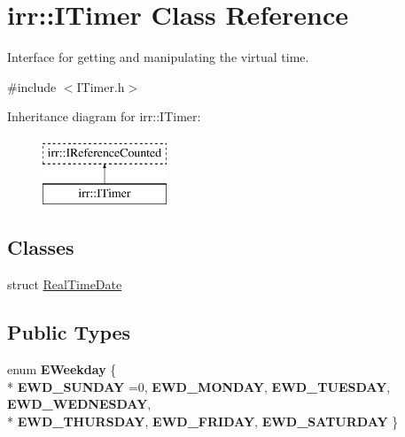 \hypertarget{classirr_1_1ITimer}{}\section{irr\+:\+:I\+Timer Class Reference}
\label{classirr_1_1ITimer}


Interface for getting and manipulating the virtual time.  




{\ttfamily \#include $<$I\+Timer.\+h$>$}

Inheritance diagram for irr\+:\+:I\+Timer\+:\begin{figure}[H]
\begin{center}
\leavevmode
\includegraphics[height=2.000000cm]{classirr_1_1ITimer}
\end{center}
\end{figure}
\subsection*{Classes}
\begin{DoxyCompactItemize}
\item 
struct \hyperlink{structirr_1_1ITimer_1_1RealTimeDate}{Real\+Time\+Date}
\end{DoxyCompactItemize}
\subsection*{Public Types}
\begin{DoxyCompactItemize}
\item 
enum {\bfseries E\+Weekday} \{ \\*
{\bfseries E\+W\+D\+\_\+\+S\+U\+N\+D\+AY} =0, 
{\bfseries E\+W\+D\+\_\+\+M\+O\+N\+D\+AY}, 
{\bfseries E\+W\+D\+\_\+\+T\+U\+E\+S\+D\+AY}, 
{\bfseries E\+W\+D\+\_\+\+W\+E\+D\+N\+E\+S\+D\+AY}, 
\\*
{\bfseries E\+W\+D\+\_\+\+T\+H\+U\+R\+S\+D\+AY}, 
{\bfseries E\+W\+D\+\_\+\+F\+R\+I\+D\+AY}, 
{\bfseries E\+W\+D\+\_\+\+S\+A\+T\+U\+R\+D\+AY}
 \}\hypertarget{classirr_1_1ITimer_a2758e01562bb2e5c0087d104bbd98b83}{}\label{classirr_1_1ITimer_a2758e01562bb2e5c0087d104bbd98b83}

\end{DoxyCompactItemize}
